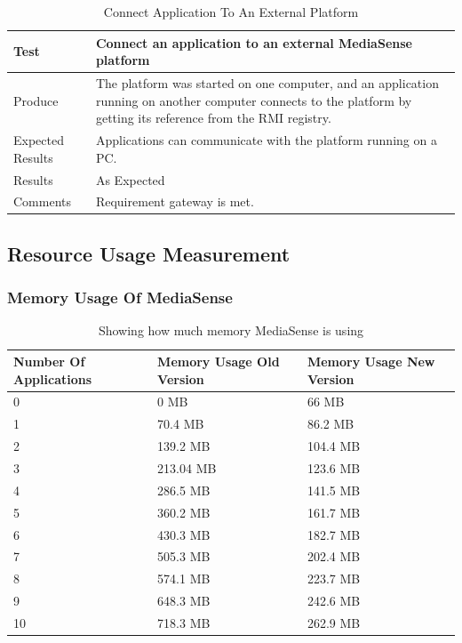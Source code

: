 \begin{table}[!h]
    \begin{tabular}{ | l | p{12cm} |}
    \hline
    Test 	 				& 		 Connect an application to an external MediaSense platform\\ \hline
	Produce  				& 		 The platform was started on one computer, and an application running on another computer connects to the platform by getting its reference from the RMI registry.\\ \hline
	Expected Results  		& 		 Applications can communicate with the platform running on a PC. \\ \hline
	Results 				& 		 As Expected\\ \hline
	Comments				& 		 Requirement gateway is met. \\ \hline
    \end{tabular}
    \caption{Connect Application To An External Platform}
\end{table}
\clearpage


\subsection{Resource Usage Measurement}

\subsubsection{Memory Usage Of MediaSense}
\begin{table}[H]
\begin{center}
    \begin{tabular}[t!]{ | l | l | l |}
    \hline
    Number Of Applications								& Memory Usage Old Version				& Memory Usage New Version\\ \hline
    0 													& 0 MB									& 66 MB\\ \hline
    1 													& 70.4 MB								& 86.2 MB\\ \hline
    2 													& 139.2 MB								& 104.4 MB\\ \hline
    3 													& 213.04 MB								& 123.6 MB\\ \hline
    4 													& 286.5 MB								& 141.5 MB\\ \hline
    5 													& 360.2 MB								& 161.7 MB\\ \hline
    6 													& 430.3 MB								& 182.7 MB\\ \hline
    7 													& 505.3 MB								& 202.4 MB\\ \hline
    8 													& 574.1 MB								& 223.7 MB\\ \hline
    9 													& 648.3 MB								& 242.6 MB\\ \hline
    10 													& 718.3 MB								& 262.9 MB\\ \hline
    \end{tabular}
    \caption{Showing how much memory MediaSense is using}
    \label{tab:mem}
\end{center}
\end{table}


